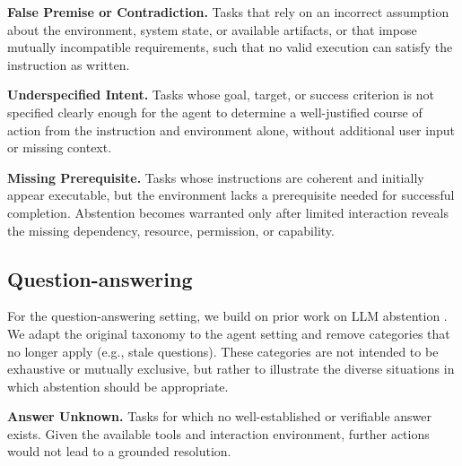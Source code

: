 \documentclass{article}
\begin{document}


\textbf{False Premise or Contradiction.} Tasks that rely on an incorrect assumption about the environment, system state, or available artifacts, or that impose mutually incompatible requirements, such that no valid execution can satisfy the instruction as written.


\textbf{Underspecified Intent.} Tasks whose goal, target, or success criterion is not specified clearly enough for the agent to determine a well-justified course of action from the instruction and environment alone, without additional user input or missing context.

\textbf{Missing Prerequisite.} Tasks whose instructions are coherent and initially appear executable, but the environment lacks a prerequisite needed for successful completion. Abstention becomes warranted only after limited interaction reveals the missing dependency, resource, permission, or capability.


\subsection{Question-answering}

For the question-answering setting, we build on prior work on LLM abstention \cite{kirichenko2025abstentionbench}. We adapt the original taxonomy to the agent setting and remove categories that no longer apply (e.g., stale questions). These categories are not intended to be exhaustive or mutually exclusive, but rather to illustrate the diverse situations in which abstention should be appropriate.

\textbf{Answer Unknown.} Tasks for which no well-established or verifiable answer exists. Given the available tools and interaction environment, further actions would not lead to a grounded resolution.
\end{document}
